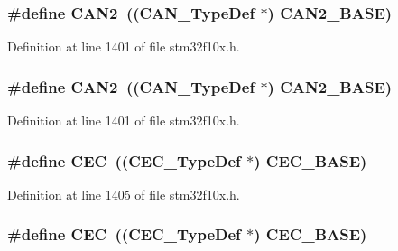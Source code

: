 \subsubsection[{\texorpdfstring{C\+A\+N2}{CAN2}}]{\setlength{\rightskip}{0pt plus 5cm}\#define C\+A\+N2~(({\bf C\+A\+N\+\_\+\+Type\+Def} $\ast$) {\bf C\+A\+N2\+\_\+\+B\+A\+SE})}\hypertarget{group___peripheral__declaration_gac5e4c86ed487dc91418b156e24808033}{}\label{group___peripheral__declaration_gac5e4c86ed487dc91418b156e24808033}


Definition at line 1401 of file stm32f10x.\+h.

\subsubsection[{\texorpdfstring{C\+A\+N2}{CAN2}}]{\setlength{\rightskip}{0pt plus 5cm}\#define C\+A\+N2~(({\bf C\+A\+N\+\_\+\+Type\+Def} $\ast$) {\bf C\+A\+N2\+\_\+\+B\+A\+SE})}\hypertarget{group___peripheral__declaration_gac5e4c86ed487dc91418b156e24808033}{}\label{group___peripheral__declaration_gac5e4c86ed487dc91418b156e24808033}


Definition at line 1401 of file stm32f10x.\+h.

\subsubsection[{\texorpdfstring{C\+EC}{CEC}}]{\setlength{\rightskip}{0pt plus 5cm}\#define C\+EC~(({\bf C\+E\+C\+\_\+\+Type\+Def} $\ast$) {\bf C\+E\+C\+\_\+\+B\+A\+SE})}\hypertarget{group___peripheral__declaration_ga7d03f4d873d59ff8bc76b6c9b576f3e3}{}\label{group___peripheral__declaration_ga7d03f4d873d59ff8bc76b6c9b576f3e3}


Definition at line 1405 of file stm32f10x.\+h.

\subsubsection[{\texorpdfstring{C\+EC}{CEC}}]{\setlength{\rightskip}{0pt plus 5cm}\#define C\+EC~(({\bf C\+E\+C\+\_\+\+Type\+Def} $\ast$) {\bf C\+E\+C\+\_\+\+B\+A\+SE})}\hypertarget{group___peripheral__declaration_ga7d03f4d873d59ff8bc76b6c9b576f3e3}{}\label{group___peripheral__declaration_ga7d03f4d873d59ff8bc76b6c9b576f3e3}



